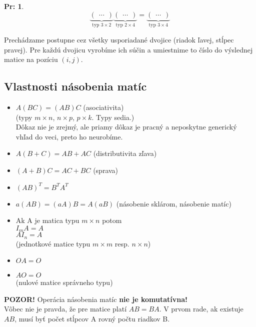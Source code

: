 \documentclass[12pt, a4paper]{article}
\theoremstyle{definition}
\newtheorem*{example}{Pr:}
\begin{document}
\begin{example}
\[ \underbrace{\begin{pmatrix} \dots \end{pmatrix}}_{\text{typ } 3 \times 2} \underbrace{\begin{pmatrix} \dots \end{pmatrix}}_{\text{typ } 2 \times 4} = \underbrace{\begin{pmatrix} \dots \end{pmatrix}}_{\text{typ } 3 \times 4} \]
\end{example}
Prechádzame postupne cez všetky usporiadané dvojice (riadok ľavej, stĺpec pravej). Pre každú dvojicu vyrobíme ich súčin a umiestnime to číslo do výslednej matice na pozíciu $(i, j)$.

\subsection*{Vlastnosti násobenia matíc}
\begin{itemize}
    \item $A (B C) = (A B) C$ (asociativita) \\
    (typy $m \times n$, $n \times p$, $p \times k$. Typy sedia.) \\
    Dôkaz nie je zrejmý, ale priamy dôkaz je pracný a neposkytne generický vhľad do veci, preto ho neurobíme.
    
    \item $A (B + C) = AB + AC$ (distributivita zľava)
    \item $(A + B) C = AC + BC$ (sprava)
    \item $(AB)^T = B^T A^T$
    \item $a (AB) = (aA) B = A (aB)$ (násobenie sklárom, násobenie matíc)
    
    \item Ak A je matica typu $m \times n$ potom \\
    $I_m A = A$ \\
    $A I_n = A$ \\
    (jednotkové matice typu $m \times m$ resp. $n \times n$)
    
    \item $OA = O$
    \item $A O = O$ \\
    (nulové matice správneho typu)
\end{itemize}

\textbf{POZOR!} Operácia násobenia matíc \textbf{nie je komutatívna!} \\
Vôbec nie je pravda, že pre matice platí $AB = BA$.
V prvom rade, ak existuje $AB$, musí byť počet stĺpcov A rovný počtu riadkov B.
\end{document}
